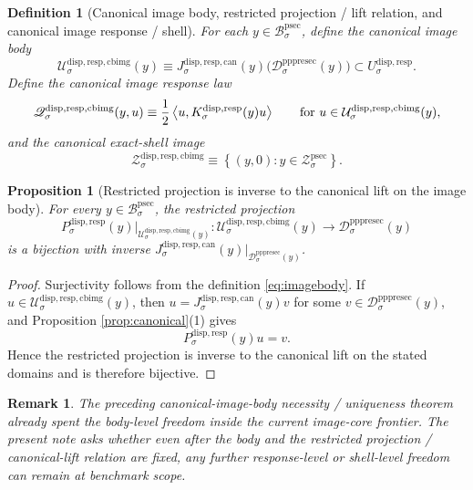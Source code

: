 \documentclass[11pt]{article}
\newcommand{\ProtoSectionBody}[1]{\mathcal B_{#1}^{\mathrm{psec}}}
\newcommand{\ProtoSectionShell}[1]{\mathcal Z_{#1}^{\mathrm{psec}}}
\newcommand{\PrePreProtoSectionResidualBody}[1]{\mathcal D_{#1}^{\mathrm{pppresec}}}
\newcommand{\SubstrateCarrier}[1]{U_{#1}^{\mathrm{disp,resp}}}
\newcommand{\SubstrateProjection}[1]{P_{#1}^{\mathrm{disp,resp}}}
\newcommand{\SubstrateOperator}[1]{K_{#1}^{\mathrm{disp,resp}}}
\newcommand{\CanonicalLift}[1]{J_{#1}^{\mathrm{disp,resp,can}}}
\newcommand{\CanonicalImageBody}[1]{\mathcal U_{#1}^{\mathrm{disp,resp,cbimg}}}
\newcommand{\CanonicalImageShell}[1]{\mathcal Z_{#1}^{\mathrm{disp,resp,cbimg}}}
\newcommand{\CanonicalImageResponseLaw}[1]{\mathscr Q_{#1}^{\mathrm{disp,resp,cbimg}}}
\newtheorem{definition}{Definition}
\newtheorem{proposition}{Proposition}
\newtheorem{remark}{Remark}
\begin{document}
\begin{definition}[Canonical image body, restricted projection / lift relation, and canonical image response / shell]
\label{def:image}
For each \(y\in\ProtoSectionBody{\sigma}\), define the \emph{canonical image body}
\begin{equation}
\CanonicalImageBody{\sigma}(y)
\equiv
\CanonicalLift{\sigma}(y)\bigl(\PrePreProtoSectionResidualBody{\sigma}(y)\bigr)
\subset
\SubstrateCarrier{\sigma}.
\label{eq:imagebody}
\end{equation}
Define the \emph{canonical image response law}
\begin{equation}
\CanonicalImageResponseLaw{\sigma}(y,u)
\equiv
\frac{1}{2}
\ev{u,\SubstrateOperator{\sigma}(y)u}
\qquad
\text{for }
u\in\CanonicalImageBody{\sigma}(y),
\label{eq:imageresponse}
\end{equation}
and the \emph{canonical exact-shell image}
\begin{equation}
\CanonicalImageShell{\sigma}
\equiv
\left\{
(y,0):y\in\ProtoSectionShell{\sigma}
\right\}.
\label{eq:imageshell}
\end{equation}
\end{definition}

\begin{proposition}[Restricted projection is inverse to the canonical lift on the image body]
\label{prop:restricted}
For every \(y\in\ProtoSectionBody{\sigma}\), the restricted projection
\[
\SubstrateProjection{\sigma}(y)\big|_{\CanonicalImageBody{\sigma}(y)}
:
\CanonicalImageBody{\sigma}(y)\to\PrePreProtoSectionResidualBody{\sigma}(y)
\]
is a bijection with inverse \(\CanonicalLift{\sigma}(y)\big|_{\PrePreProtoSectionResidualBody{\sigma}(y)}\).
\end{proposition}

\begin{proof}
Surjectivity follows from the definition \eqref{eq:imagebody}. If \(u\in\CanonicalImageBody{\sigma}(y)\), then \(u=\CanonicalLift{\sigma}(y)v\) for some \(v\in\PrePreProtoSectionResidualBody{\sigma}(y)\), and Proposition \ref{prop:canonical}(1) gives
\[
\SubstrateProjection{\sigma}(y)u=v.
\]
Hence the restricted projection is inverse to the canonical lift on the stated domains and is therefore bijective.
\end{proof}

\begin{remark}
The preceding canonical-image-body necessity / uniqueness theorem already spent the body-level freedom inside the current image-core frontier. The present note asks whether even after the body and the restricted projection / canonical-lift relation are fixed, any further response-level or shell-level freedom can remain at benchmark scope.
\end{remark}
\end{document}
